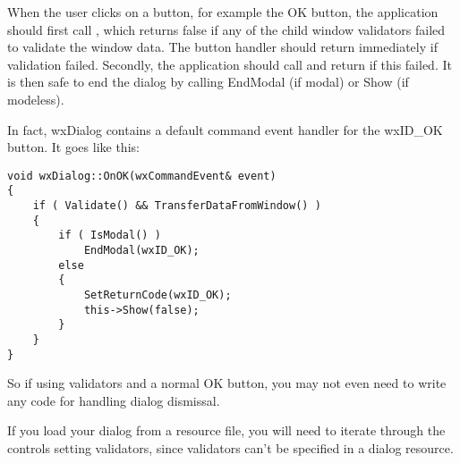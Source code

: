 
When the user clicks on a button, for example the OK button, the application should
first call , which returns false if
any of the child window validators failed to validate the window data. The button handler
should return immediately if validation failed. Secondly, the application should
call  and
return if this failed. It is then safe to end the dialog by calling EndModal (if modal)
or Show (if modeless).

In fact, wxDialog contains a default command event handler for the wxID\_OK button. It goes like
this:

\begin{verbatim}
void wxDialog::OnOK(wxCommandEvent& event)
{
	if ( Validate() && TransferDataFromWindow() )
	{
        if ( IsModal() )
            EndModal(wxID_OK);
        else
        {
		    SetReturnCode(wxID_OK);
		    this->Show(false);
        }
	}
}
\end{verbatim}

So if using validators and a normal OK button, you may not even need to write any
code for handling dialog dismissal.

If you load your dialog from a resource file, you will need to iterate through the controls
setting validators, since validators can't be specified in a dialog resource.

